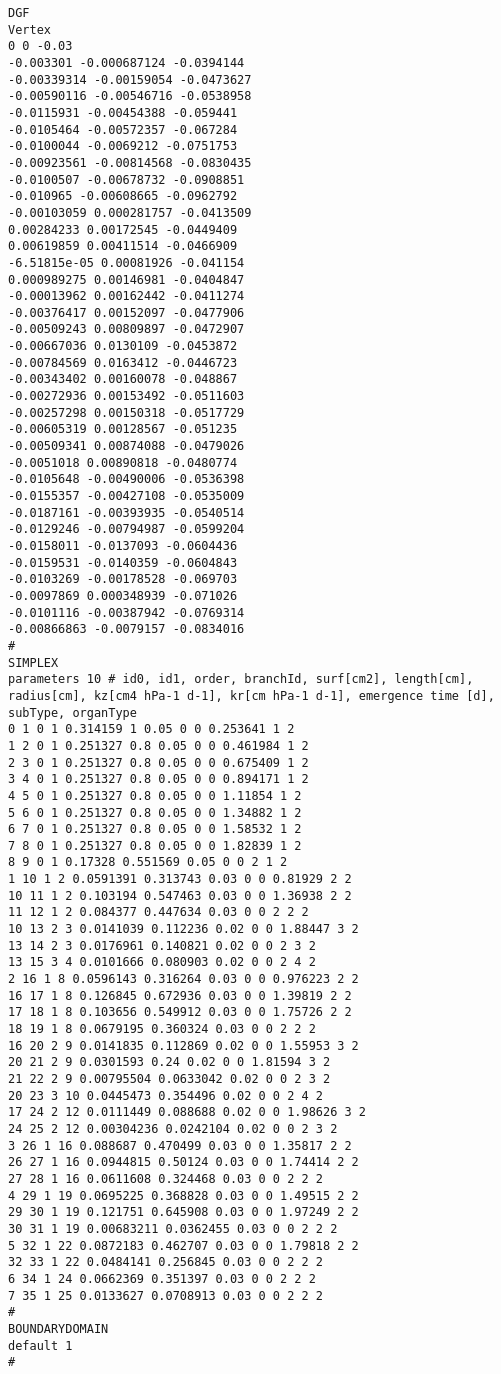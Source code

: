 \begin{lstlisting}
DGF
Vertex
0 0 -0.03
-0.003301 -0.000687124 -0.0394144
-0.00339314 -0.00159054 -0.0473627
-0.00590116 -0.00546716 -0.0538958
-0.0115931 -0.00454388 -0.059441
-0.0105464 -0.00572357 -0.067284
-0.0100044 -0.0069212 -0.0751753
-0.00923561 -0.00814568 -0.0830435
-0.0100507 -0.00678732 -0.0908851
-0.010965 -0.00608665 -0.0962792
-0.00103059 0.000281757 -0.0413509
0.00284233 0.00172545 -0.0449409
0.00619859 0.00411514 -0.0466909
-6.51815e-05 0.00081926 -0.041154
0.000989275 0.00146981 -0.0404847
-0.00013962 0.00162442 -0.0411274
-0.00376417 0.00152097 -0.0477906
-0.00509243 0.00809897 -0.0472907
-0.00667036 0.0130109 -0.0453872
-0.00784569 0.0163412 -0.0446723
-0.00343402 0.00160078 -0.048867
-0.00272936 0.00153492 -0.0511603
-0.00257298 0.00150318 -0.0517729
-0.00605319 0.00128567 -0.051235
-0.00509341 0.00874088 -0.0479026
-0.0051018 0.00890818 -0.0480774
-0.0105648 -0.00490006 -0.0536398
-0.0155357 -0.00427108 -0.0535009
-0.0187161 -0.00393935 -0.0540514
-0.0129246 -0.00794987 -0.0599204
-0.0158011 -0.0137093 -0.0604436
-0.0159531 -0.0140359 -0.0604843
-0.0103269 -0.00178528 -0.069703
-0.0097869 0.000348939 -0.071026
-0.0101116 -0.00387942 -0.0769314
-0.00866863 -0.0079157 -0.0834016
#
SIMPLEX
parameters 10 # id0, id1, order, branchId, surf[cm2], length[cm], radius[cm], kz[cm4 hPa-1 d-1], kr[cm hPa-1 d-1], emergence time [d], subType, organType 
0 1 0 1 0.314159 1 0.05 0 0 0.253641 1 2
1 2 0 1 0.251327 0.8 0.05 0 0 0.461984 1 2
2 3 0 1 0.251327 0.8 0.05 0 0 0.675409 1 2
3 4 0 1 0.251327 0.8 0.05 0 0 0.894171 1 2
4 5 0 1 0.251327 0.8 0.05 0 0 1.11854 1 2
5 6 0 1 0.251327 0.8 0.05 0 0 1.34882 1 2
6 7 0 1 0.251327 0.8 0.05 0 0 1.58532 1 2
7 8 0 1 0.251327 0.8 0.05 0 0 1.82839 1 2
8 9 0 1 0.17328 0.551569 0.05 0 0 2 1 2
1 10 1 2 0.0591391 0.313743 0.03 0 0 0.81929 2 2
10 11 1 2 0.103194 0.547463 0.03 0 0 1.36938 2 2
11 12 1 2 0.084377 0.447634 0.03 0 0 2 2 2
10 13 2 3 0.0141039 0.112236 0.02 0 0 1.88447 3 2
13 14 2 3 0.0176961 0.140821 0.02 0 0 2 3 2
13 15 3 4 0.0101666 0.080903 0.02 0 0 2 4 2
2 16 1 8 0.0596143 0.316264 0.03 0 0 0.976223 2 2
16 17 1 8 0.126845 0.672936 0.03 0 0 1.39819 2 2
17 18 1 8 0.103656 0.549912 0.03 0 0 1.75726 2 2
18 19 1 8 0.0679195 0.360324 0.03 0 0 2 2 2
16 20 2 9 0.0141835 0.112869 0.02 0 0 1.55953 3 2
20 21 2 9 0.0301593 0.24 0.02 0 0 1.81594 3 2
21 22 2 9 0.00795504 0.0633042 0.02 0 0 2 3 2
20 23 3 10 0.0445473 0.354496 0.02 0 0 2 4 2
17 24 2 12 0.0111449 0.088688 0.02 0 0 1.98626 3 2
24 25 2 12 0.00304236 0.0242104 0.02 0 0 2 3 2
3 26 1 16 0.088687 0.470499 0.03 0 0 1.35817 2 2
26 27 1 16 0.0944815 0.50124 0.03 0 0 1.74414 2 2
27 28 1 16 0.0611608 0.324468 0.03 0 0 2 2 2
4 29 1 19 0.0695225 0.368828 0.03 0 0 1.49515 2 2
29 30 1 19 0.121751 0.645908 0.03 0 0 1.97249 2 2
30 31 1 19 0.00683211 0.0362455 0.03 0 0 2 2 2
5 32 1 22 0.0872183 0.462707 0.03 0 0 1.79818 2 2
32 33 1 22 0.0484141 0.256845 0.03 0 0 2 2 2
6 34 1 24 0.0662369 0.351397 0.03 0 0 2 2 2
7 35 1 25 0.0133627 0.0708913 0.03 0 0 2 2 2
#
BOUNDARYDOMAIN 
default 1
#
\end{lstlisting}

